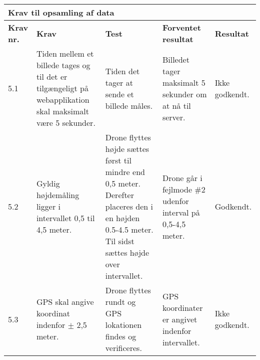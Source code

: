     \begin{tabular}{|p{}|p{3.2 cm}|p{3.2 cm}|p{3.2 cm}|p{2.2 cm}|}
			\hline
			\multicolumn{5}{|l|}{\textbf{{\large Krav til opsamling af data}}}\\ \hline
			\textbf{Krav nr.} & \textbf{Krav} & \textbf{Test} & \textbf{Forventet \newline resultat} & 			
			\textbf{Resultat} \\ \hline
			
			5.1 & Tiden mellem et billede tages og til det er tilgængeligt på webapplikation skal maksimalt være 5 sekunder.
				& Tiden det tager at sende et billede måles.
				& Billedet tager maksimalt 5 sekunder om at nå til server.
				& Ikke \newline godkendt.\\ \hline			
			
			5.2 & Gyldig højdemåling ligger i intervallet 0,5 til 4,5 meter.
				& Drone flyttes højde sættes først til mindre end 0,5 meter. Derefter placeres den i en højden 0.5-4.5 meter. Til sidst sættes højde over intervallet. 
				& Drone går i fejlmode \#2 udenfor interval på 0,5-4,5 meter.
				& Godkendt. \\ \hline

			5.3 & GPS skal angive koordinat indenfor $\pm$ 2,5 meter. 
				& Drone flyttes rundt og GPS lokationen findes og verificeres.
				& GPS koordinater er angivet indenfor intervallet. 
				& Ikke \newline godkendt. \\ \hline		
		\end{tabular}
	\label{tab:krav_1}				
		